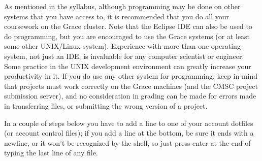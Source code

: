 \documentclass[10pt]{article}
\begin{document}
   As mentioned in the syllabus, although programming may be done on other
  systems that you have access to, it is recommended that you do all your
  coursework on the Grace cluster.  Note that the Eclipse IDE can also be
  used to do programming, but you are encouraged to use the Grace systems
  (or at least some other UNIX/Linux system).  Experience with more than one
  operating system, not just an IDE, is invaluable for any computer
  scientist or engineer.  Some practice in the UNIX development environment
  can greatly increase your productivity in it.  If you do use any other
  system for programming, keep in mind that projects must work correctly on
  the Grace machines (and the CMSC project submission server), and no
  consideration in grading can be made for errors made in transferring
  files, or submitting the wrong version of a project.

    In a couple of steps below you have to add a line to one of your account
  dotfiles (or account control files); if you add a line at the bottom, be
  sure it ends with a newline, or it won't be recognized by the shell, so
  just press enter at the end of typing the last line of any file.

    \vspace{-1.75mm}
\end{document}

